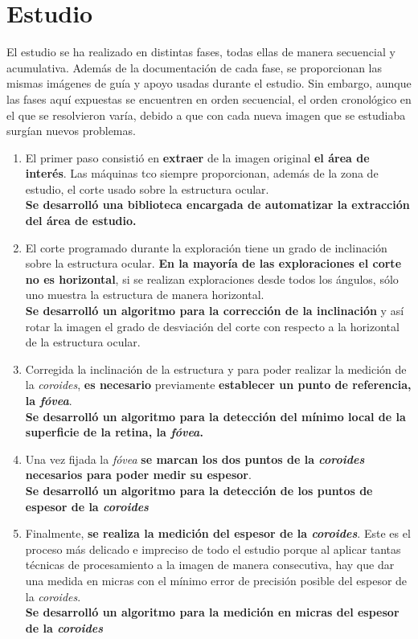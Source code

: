 \section{Estudio}
El estudio se ha realizado en distintas fases, todas ellas de manera
secuencial y acumulativa. Además de la documentación de cada fase, se
proporcionan las mismas imágenes de guía y apoyo usadas durante el
estudio.  Sin embargo, aunque las fases aquí expuestas se encuentren
en orden secuencial, el orden cronológico en el que se resolvieron
varía, debido a que con cada nueva imagen que se estudiaba surgían
nuevos problemas.
\begin{enumerate}
\item El primer paso consistió en \textbf{extraer} de la imagen
  original \textbf{el área de interés}. Las máquinas \gls{tco} siempre
  proporcionan, además
  de la zona de estudio, el corte usado sobre la estructura ocular. \\
  \textbf{Se desarrolló una biblioteca encargada de automatizar la
    extracción del área de estudio.}
\item El corte programado durante la exploración tiene un grado de
  inclinación sobre la estructura ocular. \textbf{En la mayoría de las
    exploraciones el corte no es horizontal}, si se realizan
  exploraciones desde todos los ángulos, sólo uno muestra la
  estructura
  de manera horizontal. \\
  \textbf{Se desarrolló un algoritmo para la corrección de la
    inclinación} y así rotar la imagen el grado de desviación del
  corte con respecto a la horizontal de la estructura ocular.
\item Corregida la inclinación de la estructura y para poder realizar
  la medición de la \emph{coroides}, \textbf{es necesario} previamente
  \textbf{establecer un punto de referencia, la \emph{fóvea}}. \\
  \textbf{Se desarrolló un algoritmo para la detección del mínimo
    local de la superficie de la retina, la \emph{fóvea}.}
\item Una vez fijada la \emph{fóvea} \textbf{se marcan los dos puntos
    de la \emph{coroides} necesarios para poder medir su espesor}. \\
  \textbf{Se desarrolló un algoritmo para la detección de los puntos
    de espesor de la \emph{coroides}}
\item Finalmente, \textbf{se realiza la medición del espesor de la
    \emph{coroides}}. Este es el proceso más delicado e impreciso de
  todo el estudio porque al aplicar tantas técnicas de procesamiento a
  la imagen de manera consecutiva, hay que dar una medida en micras
  con el mínimo error de precisión posible del espesor de la \emph{coroides}. \\
  \textbf{Se desarrolló un algoritmo para la medición en micras del
    espesor de la \emph{coroides}}
\end{enumerate}

